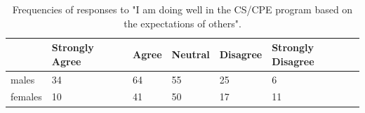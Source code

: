 \documentclass[a4paper,man,natbib]{apa6}
\begin{document}
\begin{table}
\begin{tabular}{l|l|l|l|l|l}
		& Strongly Agree	& Agree	& Neutral	& Disagree	& Strongly Disagree \\\hline
males	& 34				& 64	& 55		& 25		& 6 \\
females & 10				& 41	& 50		& 17		& 11 
\end{tabular}
\caption{\label{tab:expec-other}Frequencies of responses to "I am doing well in the CS/CPE program based on the expectations of others".}
\end{table}


\end{document}
